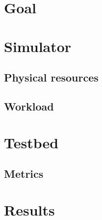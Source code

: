 

\section{Goal}

\section{Simulator}

\subsection{Physical resources}

\subsection{Workload}

\section{Testbed}

\subsection{Metrics}

\section{Results}
